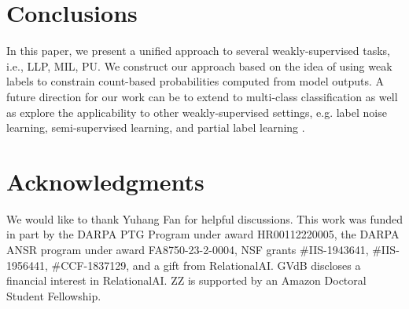 \documentclass{article}
\begin{document}
\section{Conclusions}
In this paper, we present a unified approach to several weakly-supervised tasks, i.e., LLP, MIL, PU. We construct our approach based on the idea of using weak labels to constrain count-based probabilities computed from model outputs. A future direction for our work can be to extend to multi-class classification as well as explore the applicability to other weakly-supervised settings, e.g. label noise learning, semi-supervised learning, and partial label learning \cite{cour2011partial, natarajan2011, zhu2005semi}. 

\section*{Acknowledgments}
We would like to thank Yuhang Fan for helpful discussions.
This work was funded in part by the DARPA PTG Program under award HR00112220005, the DARPA ANSR program under award FA8750-23-2-0004, 
NSF grants \#IIS-1943641, \#IIS-1956441, \#CCF-1837129, and a gift from RelationalAI. GVdB discloses a financial interest in RelationalAI. ZZ is supported by an Amazon Doctoral Student Fellowship. 





\clearpage
\appendix
\end{document}
